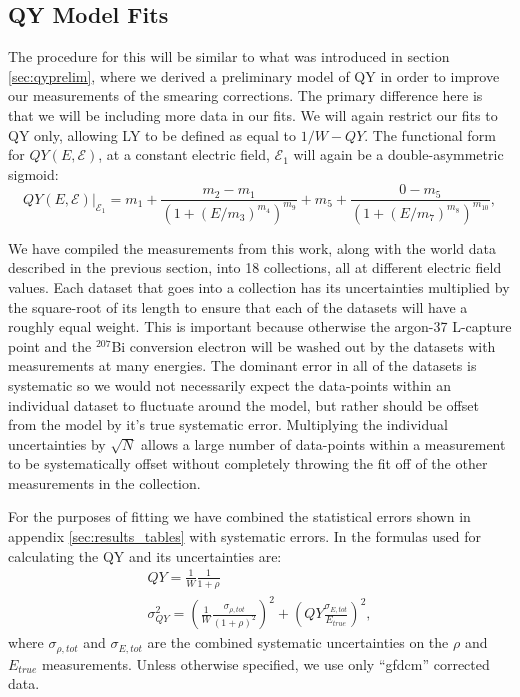 \subsection{QY Model Fits}
The procedure for this will be similar to what was introduced in section \ref{sec:qyprelim}, where we derived a preliminary model of QY in order to improve our measurements of the smearing corrections. The primary difference here is that we will be including more data in our fits. We will again restrict our fits to QY only, allowing LY to be defined as equal to $1/W-QY$. The functional form for $QY(E,\mathcal{E})$, at a constant electric field, $\mathcal{E}_1$ will again be a double-asymmetric sigmoid:
\begin{equation}
QY(E,\mathcal{E})|_{\mathcal{E}_1}=m_1+\frac{m_2-m_1}{(1+(E/m_3)^{m_4})^{m_9}}+m_5+\frac{0-m_5}{(1+(E/m_7)^{m_8})^{m_{10}}},
\end{equation}

We have compiled the measurements from this work, along with the world data described in the previous section, into 18 collections, all at different electric field values. Each dataset that goes into a collection has its uncertainties multiplied by the square-root of its length to ensure that each of the datasets will have a roughly equal weight. This is important because otherwise the argon-37 L-capture point and the $^{207}$Bi conversion electron will be washed out by the datasets with measurements at many energies. The dominant error in all of the datasets is systematic so we would not necessarily expect the data-points within an individual dataset to fluctuate around the model, but rather should be offset from the model by it's true systematic error. Multiplying the individual uncertainties by $\sqrt{N}$ allows a large number of data-points within a measurement to be systematically offset without completely throwing the fit off of the other measurements in the collection.

For the purposes of fitting we have combined the statistical errors shown in appendix \ref{sec:results_tables} with systematic errors. In the formulas used for calculating the QY and its uncertainties are:
\begin{equation}
\begin{split}
QY=\frac{1}{W}\frac{1}{1+\rho}\\
\sigma_{QY}^2=\left(\frac{1}{W}\frac{\sigma_{\rho,tot}}{(1+\rho)^2}\right)^2+\left(QY\frac{\sigma_{E,tot}}{E_{true}}\right)^2,
\end{split}
\end{equation}
where $\sigma_{\rho,tot}$ and $\sigma_{E,tot}$ are the combined systematic uncertainties on the $\rho$ and $E_{true}$ measurements. Unless otherwise specified, we use only ``gfdcm'' corrected data.

